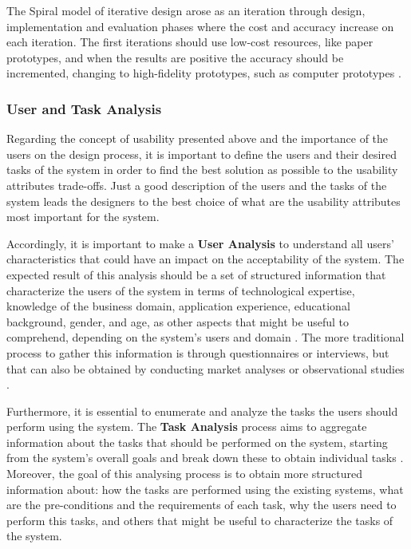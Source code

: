 The Spiral model of iterative design arose as an iteration through design, implementation and evaluation phases where the cost and accuracy increase on each iteration. The first iterations should use low-cost resources, like paper prototypes, and when the results are positive the accuracy should be incremented, changing to high-fidelity prototypes, such as computer prototypes \cite{interactionDesign_beyondHumanComputerInteraction}. %


\subsubsection{User and Task Analysis}
\label{subsubsec:user_and_task_analysis}
Regarding the concept of usability presented above and the importance of the users on the design process, it is important to define the users and their desired tasks of the system in order to find the best solution as possible to the usability attributes trade-offs. Just a good description of the users and the tasks of the system leads the designers to the best choice of what are the usability attributes most important for the system.

Accordingly, it is important to make a \textbf{User Analysis} to understand all users’ characteristics that could have an impact on the acceptability of the system. The expected result of this analysis should be a set of structured information that characterize the users of the system in terms of technological expertise, knowledge of the business domain, application experience, educational background, gender, and age, as other aspects that might be useful to comprehend, depending on the system’s users and domain \cite{userAnalysisInHCI_theHistoricalLessonFromIndividualDifferencesResearch}. The more traditional process to gather this information is through questionnaires or interviews, but that can also be obtained by conducting market analyses or observational studies \cite{usabilityEngineering}.

Furthermore, it is essential to enumerate and analyze the tasks the users should perform using the system. The \textbf{Task Analysis} process aims to aggregate information about the tasks that should be performed on the system, starting from the system's overall goals and break down these to obtain individual tasks \cite{usabilityEngineering}. Moreover, the goal of this analysing process is to obtain more structured information about: how the tasks are performed using the existing systems, what are the pre-conditions and the requirements of each task, why the users need to perform this tasks, and others that might be useful to characterize the tasks of the system. 

